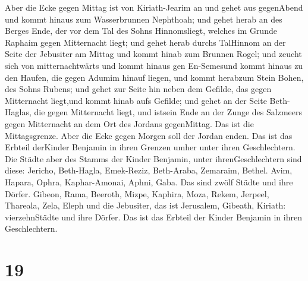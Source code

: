  Aber die Ecke gegen Mittag ist von Kiriath-Jearim an und
gehet aus gegenAbend und kommt hinaus zum Wasserbrunnen Nephthoah;
 und gehet herab an des Berges Ende, der vor dem Tal des
Sohns Hinnomsliegt, welches im Grunde Raphaim gegen Mitternacht liegt;
und gehet herab durchs TalHinnom an der Seite der Jebusiter am Mittag
und kommt hinab zum Brunnen Rogel;  und zeucht sich von
mitternachtwärts und kommt hinaus gen En-Semesund kommt hinaus zu den
Haufen, die gegen Adumim hinauf liegen, und kommt herabzum Stein Bohen,
des Sohns Rubens;  und gehet zur Seite hin neben dem
Gefilde, das gegen Mitternacht liegt,und kommt hinab aufs Gefilde;
 und gehet an der Seite Beth-Haglas, die gegen Mitternacht
liegt, und istsein Ende an der Zunge des Salzmeers gegen Mitternacht an
dem Ort des Jordans gegenMittag. Das ist die Mittagsgrenze.
 Aber die Ecke gegen Morgen soll der Jordan enden. Das ist
das Erbteil derKinder Benjamin in ihren Grenzen umher unter ihren
Geschlechtern.  Die Städte aber des Stamms der Kinder
Benjamin, unter ihrenGeschlechtern sind diese: Jericho, Beth-Hagla,
Emek-Reziz,  Beth-Araba, Zemaraim, Bethel. 
Avim, Hapara, Ophra,  Kaphar-Amonai, Aphni, Gaba. Das sind
zwölf Städte und ihre Dörfer.  Gibeon, Rama, Beeroth,
 Mizpe, Kaphira, Moza,  Rekem, Jerpeel,
Thareala,  Zela, Eleph und die Jebusiter, das ist
Jerusalem, Gibeath, Kiriath: vierzehnStädte und ihre Dörfer. Das ist das
Erbteil der Kinder Benjamin in ihren Geschlechtern.

\hypertarget{section-18}{%
\section{19}\label{section-18}}

